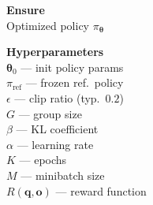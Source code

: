 \documentclass[11pt]{article}
\begin{document}
\begin{algorithm}[p]\small
\caption{GRPO --- Practical Vectorized Implementation}\label{alg:grpo-practical}
\vspace{2pt}
\noindent
\begin{minipage}[t]{0.28\linewidth}
\renewcommand{\arraystretch}{1.12}
\textbf{Ensure} \\[2pt]
Optimized policy $\pi_{\boldsymbol{\theta}}$

\vspace{6pt}
\textbf{Hyperparameters} \\[2pt]
$\boldsymbol{\theta}_0$ --- init policy params \\
$\pi_{\text{ref}}$ --- frozen ref.\ policy \\
$\epsilon$ --- clip ratio (typ.\ $0.2$) \\
$G$ --- group size \\
$\beta$ --- KL coefficient \\
$\alpha$ --- learning rate \\
$K$ --- epochs \\
$M$ --- minibatch size \\
$R(\mathbf{q}, \mathbf{o})$ --- reward function


\end{minipage}
\end{algorithm}
\end{document}
